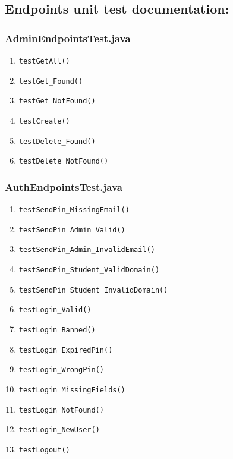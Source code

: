 \subsection{Endpoints unit test documentation:}
	
\subsubsection{AdminEndpointsTest.java}
\begin{enumerate}
	\renewcommand{\theenumi}{\arabic{enumi}}
	\renewcommand{\labelenumi}{\theenumi}
	\item \texttt{testGetAll()} \label{test:testGetAll:Admin}
	\item \texttt{testGet\_Found()} \label{test:testGet_Found:Admin}
	\item \texttt{testGet\_NotFound()} \label{test:testGet_NotFound:Admin}
	\item \texttt{testCreate()} \label{test:testCreate:Admin}
	\item \texttt{testDelete\_Found()} \label{test:testDelete_Found:Admin}
	\item \texttt{testDelete\_NotFound()} \label{test:testDelete_NotFound:Admin}
\end{enumerate}

\subsubsection{AuthEndpointsTest.java}
\begin{enumerate}
	\renewcommand{\theenumi}{\arabic{enumi}}
	\renewcommand{\labelenumi}{\theenumi}
	\item \texttt{testSendPin\_MissingEmail()} \label{test:testSendPin_MissingEmail:Auth}
	\item \texttt{testSendPin\_Admin\_Valid()} \label{test:testSendPin_Admin_Valid:Auth}
	\item \texttt{testSendPin\_Admin\_InvalidEmail()} \label{test:testSendPin_Admin_InvalidEmail:Auth}
	\item \texttt{testSendPin\_Student\_ValidDomain()} \label{test:testSendPin_Student_ValidDomain:Auth}
	\item \texttt{testSendPin\_Student\_InvalidDomain()} \label{test:testSendPin_Student_InvalidDomain:Auth}
	\item \texttt{testLogin\_Valid()} \label{test:testLogin_Vaid:Auth}
	\item \texttt{testLogin\_Banned()} \label{test:testLogin_Banned:Auth}
	\item \texttt{testLogin\_ExpiredPin()} \label{test:testLogin_ExpiredPin:Auth}
	\item \texttt{testLogin\_WrongPin()} \label{test:testLogin_WrongPin:Auth}
	\item \texttt{testLogin\_MissingFields()} \label{test:testLogin_MissingFields:Auth}
	\item \texttt{testLogin\_NotFound()} \label{test:testLogin_NotFound:Auth}
	\item \texttt{testLogin\_NewUser()}
	\label{test:testLoginNewUser:Auth}
	\item \texttt{testLogout()} \label{test:testLogout:Auth}
\end{enumerate}

